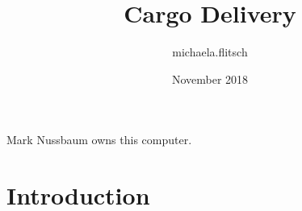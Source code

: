 \documentclass{article}
\title{Cargo Delivery}
\author{michaela.flitsch }
\date{November 2018}
\begin{document}
Mark Nussbaum owns this computer. 
\maketitle

\section{Introduction}
\end{document}
